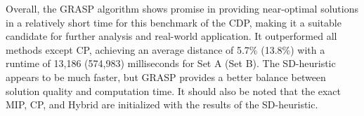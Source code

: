 \begin{table}[htbp]
    \centering
    \caption{Performance of the GRASP heuristic on the CDP benchmark instances}
    \label{tab:cdp_lit_comp}
    \scriptsize
\end{table}

Overall, the GRASP algorithm shows promise in providing near-optimal solutions in a relatively short time for this benchmark of the CDP, making it a suitable candidate for further analysis and real-world application. It outperformed all methods except CP, achieving an average distance of 5.7\% (13.8\%) with a runtime of 13,186 (574,983) milliseconds for Set A (Set B). The SD-heuristic appears to be much faster, but GRASP provides a better balance between solution quality and computation time. It should also be noted that the exact MIP, CP, and Hybrid are initialized with the results of the SD-heuristic.


